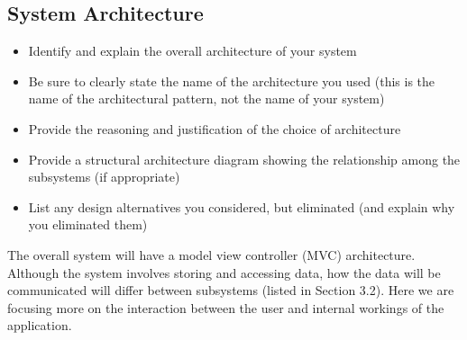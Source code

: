 \documentclass[]{article}
\begin{document}
\subsection{System Architecture}
\label{sub:system_architecture}
\begin{itemize}
	\item Identify and explain the overall architecture of your system
	\item Be sure to clearly state the name of the architecture you used (this is the name of the architectural pattern, not the name of your system)
	\item Provide the reasoning and justification of the choice of architecture
	\item Provide a structural architecture diagram showing the relationship among the subsystems (if appropriate)
	\item List any design alternatives you considered, but eliminated (and explain why you eliminated them)
\end{itemize}

The overall system will have a model view controller (MVC) architecture. Although the system involves storing and accessing data, how the data will be communicated will differ between subsystems (listed in Section 3.2). Here we are focusing more on the interaction between the user and internal workings of the application.
\end{document}
